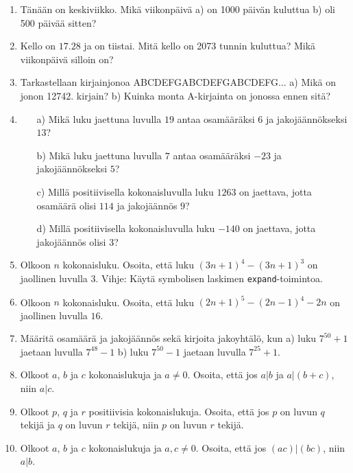 \begin{enumerate}
\item Tänään on keskiviikko. Mikä viikonpäivä a) on 1000 päivän kuluttua b) oli 500 päivää sitten?

\item Kello on $17.28$ ja on tiistai. Mitä kello on 2073 tunnin kuluttua? Mikä viikonpäivä silloin on?

\item Tarkastellaan kirjainjonoa ABCDEFGABCDEFGABCDEFG... a) Mikä on jonon 12742. kirjain? b) Kuinka monta A-kirjainta on jonossa ennen sitä?

\item 
\begin{itemize}
\item[a)] Mikä luku jaettuna luvulla $19$ antaa osamääräksi $6$ ja jakojäännökseksi $13$?
\item[b)] Mikä luku jaettuna luvulla $7$ antaa osamääräksi $-23$ ja jakojäännökseksi $5$?
\item[c)] Millä positiivisella kokonaisluvulla luku $1263$ on jaettava, jotta osamäärä olisi $114$ ja jakojäännös $9$?
\item[d)]  Millä positiivisella kokonaisluvulla luku $-140$ on jaettava, jotta jakojäännös olisi $3$?
\end{itemize}

\item Olkoon $n$ kokonaisluku. Osoita, että luku $(3n+1)^4 - (3n+1)^3$ on jaollinen luvulla 3. Vihje: Käytä symbolisen laskimen {\tt expand}-toimintoa.

\item Olkoon $n$ kokonaisluku. Osoita, että luku $(2n+1)^5 - (2n-1)^4-2n$ on jaollinen luvulla $16$.

\item Määritä osamäärä ja jakojäännös sekä kirjoita jakoyhtälö, kun a) luku $7^{50} + 1$ jaetaan luvulla $7^{48} - 1$ b) luku $7^{50} - 1$ jaetaan luvulla $7^{25} + 1$.

\item Olkoot $a$, $b$ ja $c$ kokonaislukuja ja $a \neq 0$. Osoita, että jos $a|b$ ja $a|(b + c)$, niin $a|c$.

\item Olkoot $p$, $q$ ja $r$ positiivisia kokonaislukuja. Osoita, että jos $p$ on luvun $q$ tekijä ja $q$ on luvun $r$ tekijä, niin $p$ on luvun $r$ tekijä.

\item Olkoot $a$, $b$ ja $c$ kokonaislukuja ja $a,c \neq 0$. Osoita, että jos $(ac)|(bc)$, niin $a|b$.


\end{enumerate}

